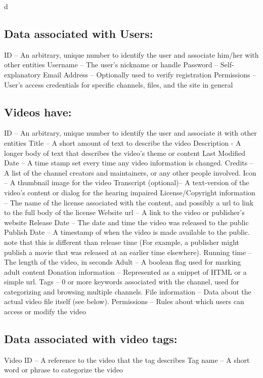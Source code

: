 d\documentclass[a4paper,12pt]{report}
\begin{document}
\subsection{Data associated with Users:}
ID – An arbitrary, unique number to identify the user and associate him/her with other entities
Username – The user's nickname or handle
Password – Self-explanatory
Email Address – Optionally used to verify registration
Permissions – User's access credentials for specific channels, files, and the site in general

\subsection{Videos have:}
ID – An arbitrary, unique number to identify the user and associate it with other entities 
Title – A short amount of text to describe the video
Description - A longer body of text that describes the video's theme or content
Last Modified Date – A time stamp set every time any video information is changed.
Credits – A list of the channel creators and maintainers, or any other people involved. 
Icon – A thumbnail image for the video
Transcript (optional)– A text-version of the video's content or dialog for the hearing impaired
License/Copyright information – The name of the license associated with the content, and possibly a url to link to the full body of the license
Website url – A link to the video  or publisher's website
Release Date – The date and time the video was released to the public
Publish Date – A timestamp of when the video is made available to the public. note that this is different than release time (For example, a publisher might publish a movie that was released at an earlier time elsewhere).
Running time – The length of the video, in seconds
Adult – A boolean flag used for marking adult content
Donation information – Represented as a snippet of HTML or a simple url.
Tags – 0 or more keywords associated with the channel, used for categorizing and 	browsing multiple channels.
File information – Data about the actual video file itself (see below).
Permissions – Rules about which users can access or modify the video

\subsection{Data associated with video tags:}
	Video ID – A reference to the video that the tag describes
	Tag name – A short word or phrase to categorize the video
\end{document}
